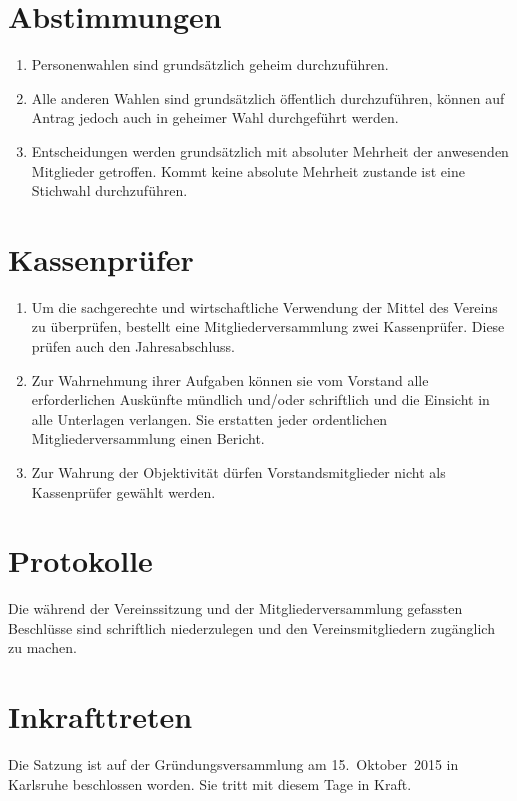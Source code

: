 \documentclass[a4paper]{scrartcl}
\newcommand\Gruendungsdatum{15.~Oktober~2015}
\begin{document}
\section{Abstimmungen}
\begin{enumerate}
    \item Personenwahlen sind grundsätzlich geheim durchzuführen.
    \item Alle anderen Wahlen sind grundsätzlich öffentlich durchzuführen,
          können auf Antrag jedoch auch in geheimer Wahl durchgeführt werden.
    \item Entscheidungen werden grundsätzlich mit absoluter Mehrheit der
          anwesenden Mitglieder getroffen. Kommt keine absolute Mehrheit
          zustande ist eine Stichwahl durchzuführen.
\end{enumerate}

\section{Kassenprüfer}
\begin{enumerate}
    \item Um die sachgerechte und wirtschaftliche Verwendung der Mittel des
          Vereins zu überprüfen, bestellt eine Mitgliederversammlung zwei
          Kassenprüfer. Diese prüfen auch den Jahresabschluss.
    \item Zur Wahrnehmung ihrer Aufgaben können sie vom Vorstand alle
          erforderlichen Auskünfte mündlich und/oder schriftlich und die
          Einsicht in alle Unterlagen verlangen. Sie erstatten jeder
          ordentlichen Mitgliederversammlung einen Bericht.
    \item Zur Wahrung der Objektivität dürfen Vorstandsmitglieder nicht als
          Kassenprüfer gewählt werden.
\end{enumerate}

\section{Protokolle}
Die während der Vereinssitzung und der Mitgliederversammlung gefassten
Beschlüsse sind schriftlich niederzulegen und den Vereinsmitgliedern
zugänglich zu machen.

\section{Inkrafttreten}
Die Satzung ist auf der Gründungsversammlung am \Gruendungsdatum{} in Karlsruhe
beschlossen worden. Sie tritt mit diesem Tage in Kraft.

\end{document}
